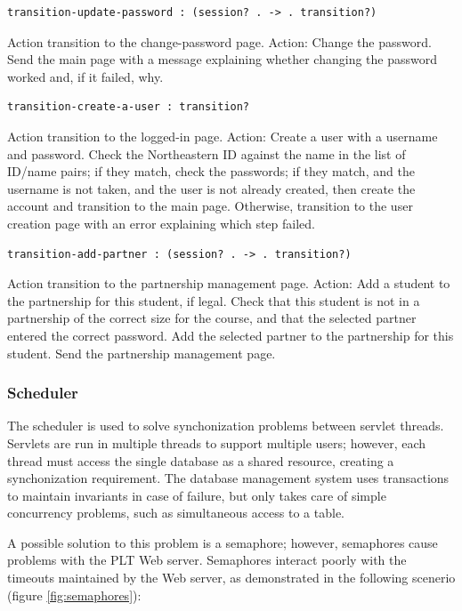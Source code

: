 \documentclass[a4paper]{article}
\begin{document}
\begin{verbatim}
transition-update-password : (session? . -> . transition?)
\end{verbatim}
Action transition to the change-password page.
Action: Change the password.
Send the main page with a message explaining whether changing the password
worked and, if it failed, why.

\begin{verbatim}
transition-create-a-user : transition?
\end{verbatim}
Action transition to the logged-in page.
Action: Create a user with a username and password.
Check the Northeastern ID against the name in the list of
ID/name pairs; if they match, check the passwords; if they
match, and the username is not taken, and the user is not
already created, then create the account and transition to
the main page. Otherwise, transition to the user
creation page with an error explaining which step failed.

\begin{verbatim}
transition-add-partner : (session? . -> . transition?)
\end{verbatim}
Action transition to the partnership management page.
Action: Add a student to the partnership for this student, if legal.
Check that this student is not in a partnership of the correct size for the
course, and that the selected partner entered the correct password. Add
the selected partner to the partnership for this student. Send the partnership
management page.

\subsubsection{Scheduler}\label{subsubsec:scheduler}

The scheduler is used to solve synchonization problems between servlet threads.
Servlets are run in multiple threads to support multiple users; however, each
thread must access the single database as a shared resource, creating a
synchonization requirement. The database management system uses transactions to
maintain invariants in case of failure, but only takes care of simple
concurrency problems, such as simultaneous access to a table.

A possible solution to this problem is a semaphore; however, semaphores cause
problems with the PLT Web server. Semaphores interact poorly with the timeouts
maintained by the Web server, as demonstrated in the following scenerio (figure
\ref{fig:semaphores}):
\end{document}
